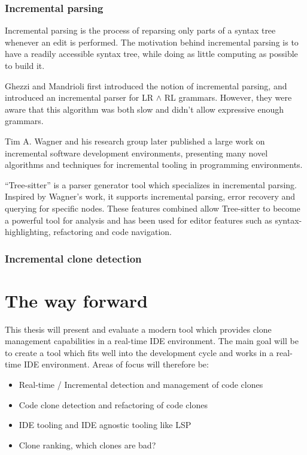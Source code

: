 \documentclass[12pt]{article}
\begin{document}
\subsubsection{Incremental parsing}

Incremental parsing is the process of reparsing only parts of a syntax tree whenever an
edit is performed. The motivation behind incremental parsing is to have a readily
accessible syntax tree, while doing as little computing as possible to build it.

Ghezzi and Mandrioli first introduced the notion of incremental parsing, and introduced an
incremental parser for LR $\land$ RL grammars. However, they were aware that this
algorithm was both slow and didn't allow expressive enough
grammars.\cite{incrementalparsing}

Tim A. Wagner and his research group later published a large work on incremental software
development environments, presenting many novel algorithms and techniques for incremental
tooling in programming environments.\cite{PracticleAlgorithmsForIncremental}

``Tree-sitter'' is a parser generator tool which specializes in incremental parsing.
Inspired by Wagner's work, it supports incremental parsing, error recovery and querying
for specific nodes.\cite{treesitter} These features combined allow Tree-sitter to become a
powerful tool for analysis and has been used for editor features such as
syntax-highlighting, refactoring and code navigation. 

\subsubsection{Incremental clone detection}


\section{The way forward}

This thesis will present and evaluate a modern tool which provides clone management
capabilities in a real-time IDE environment. The main goal will be to create a tool which
fits well into the development cycle and works in a real-time IDE environment. Areas of
focus will therefore be:

\begin{itemize}
	\item Real-time / Incremental detection and management of code clones
	\item Code clone detection and refactoring of code clones
	\item IDE tooling and IDE agnostic tooling like LSP
	\item Clone ranking, which clones are bad?
\end{itemize}
\end{document}
